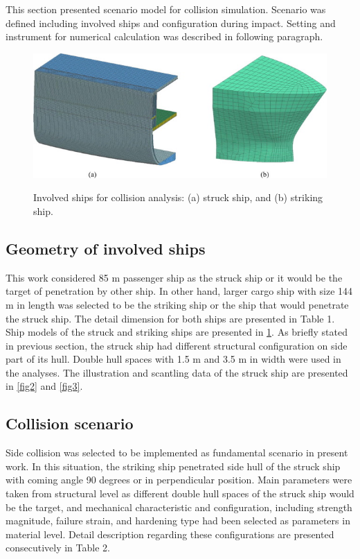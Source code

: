\documentclass[../Final.tex]{subfiles}
\begin{document}
This section presented scenario model for collision simulation. 
Scenario was defined including involved ships and configuration during impact. Setting and instrument for numerical calculation was described in following paragraph. 

\begin{figure}[h]
    \centering
    \includegraphics[width=\textwidth]{fig1.jpg}
    \label{fig1}
    \caption{Involved ships for collision analysis: (a) struck ship, and (b) striking ship.}
\end{figure}

\subsection{Geometry of involved ships}

This work considered 85 m passenger ship as the struck ship or it would be the target of penetration by other ship. 
In other hand, larger cargo ship with size 144 m in length was selected to be the striking ship or the ship that would penetrate the struck ship. 
The detail dimension for both ships are presented in Table 1. Ship models of the struck and striking ships are presented in \ref{fig1}. 
As briefly stated in previous section, the struck ship had different structural configuration on side part of its hull. Double hull spaces with 1.5 m and 3.5 m in width were used in the analyses. 
The illustration and scantling data of the struck ship are presented in \ref{fig2} and \ref{fig3}. 

\subsection{Collision scenario}

Side collision was selected to be implemented as fundamental scenario in present work. 
In this situation, the striking ship penetrated side hull of the struck ship with coming angle 90 degrees or in perpendicular position. 
Main parameters were taken from structural level as different double hull spaces of the struck ship would be the target, and mechanical character­istic and configuration, including strength magnitude, 
failure strain, and hardening type had been selected as parameters in material level. Detail description regarding these configurations are presented consecutively in Table 2. 
\end{document}
